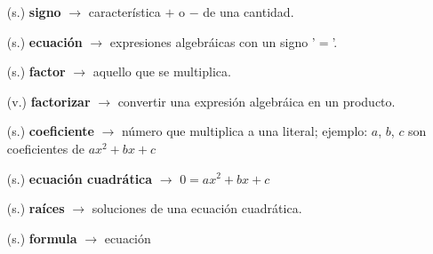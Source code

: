 \begin{tcolorbox}[
        enhanced,
        colback=orange!5!white,
        colframe=orange!35!white,
        coltitle=black,
        fonttitle=\bfseries,
        center title,
        title=Vocabulario]
    \begin{itemize}
        \item[(s.)] \textbf{signo} $\rightarrow$ característica $+$ o $-$ de una cantidad.
        \item[(s.)] \textbf{ecuación} $\rightarrow$ expresiones algebráicas con un signo '$=$'.
        \item[(s.)] \textbf{factor} $\rightarrow$ aquello que se multiplica.
        \item[(v.)] \textbf{factorizar} $\rightarrow$ convertir una expresión algebráica en un producto.
        \item[(s.)] \textbf{coeficiente} $\rightarrow$ número que multiplica a una literal; ejemplo: $a$, $b$, $c$ son coeficientes de $ax^2+bx+c$
        \item[(s.)] \textbf{ecuación cuadrática} $\rightarrow$ $0 = ax^2+bx+c$
        \item[(s.)] \textbf{raíces} $\rightarrow$ soluciones de una ecuación cuadrática.
        \item[(s.)] \textbf{formula} $\rightarrow$ ecuación
    \end{itemize}
\end{tcolorbox}
